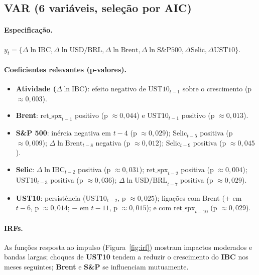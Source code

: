 \documentclass[11pt,a4paper]{article}
\begin{document}
\subsection{VAR (6 variáveis, seleção por AIC)}
\paragraph{Especificação.} \(y_t = \{\Delta \ln \text{IBC}, \Delta \ln \text{USD/BRL}, \Delta \ln \text{Brent}, \Delta \ln \text{S\&P500}, \Delta \text{Selic}, \Delta \text{UST10}\}\).

\paragraph{Coeficientes relevantes (p-valores).}
\begin{itemize}
  \item \textbf{Atividade (}\(\Delta \ln \text{IBC}\)\textbf{)}: efeito negativo de \(\text{UST10}_{t-1}\) sobre o crescimento (p \(\approx 0{,}003\)).
  \item \textbf{Brent}: \(\text{ret\_spx}_{t-1}\) positivo (p \(\approx 0{,}044\)) e \(\text{UST10}_{t-1}\) positivo (p \(\approx 0{,}013\)).
  \item \textbf{S\&P 500}: inércia negativa em \(t-4\) (p \(\approx 0{,}029\)); \(\text{Selic}_{t-5}\) positiva (p \(\approx 0{,}009\)); \(\Delta \ln \text{Brent}_{t-8}\) negativa (p \(\approx 0{,}012\)); \(\text{Selic}_{t-9}\) positiva (p \(\approx 0{,}045\)).
  \item \textbf{Selic}: \(\Delta \ln \text{IBC}_{t-2}\) positiva (p \(\approx 0{,}031\)); \(\text{ret\_spx}_{t-2}\) positiva (p \(\approx 0{,}004\)); \(\text{UST10}_{t-3}\) positiva (p \(\approx 0{,}036\)); \(\Delta \ln \text{USD/BRL}_{t-7}\) positiva (p \(\approx 0{,}029\)).
  \item \textbf{UST10}: persistência (\(\text{UST10}_{t-2}\), p \(\approx 0{,}025\)); ligações com Brent (\(+\) em \(t-6\), p \(\approx 0{,}014\); \(-\) em \(t-11\), p \(\approx 0{,}015\)); e com \(\text{ret\_spx}_{t-10}\) (p \(\approx 0{,}029\)).
\end{itemize}

\paragraph{IRFs.} As funções resposta ao impulso (Figura~\ref{fig:irf}) mostram impactos moderados e bandas largas; choques de \textbf{UST10} tendem a reduzir o crescimento do \textbf{IBC} nos meses seguintes; \textbf{Brent} e \textbf{S\&P} se influenciam mutuamente.
\end{document}
